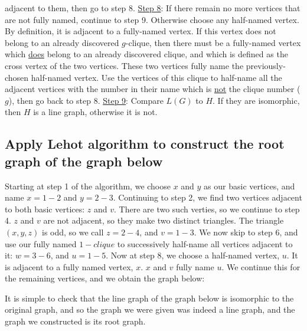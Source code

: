 \documentclass[11pt]{article}
\begin{document}
adjacent to them, then go to step 8.
\newline
\newline
\noindent
\underline{Step 8}:
If there remain no more vertices that are not fully named, continue to step 9.
Otherwise choose any half-named vertex. By definition, it is adjacent to a
fully-named vertex. If this vertex does not belong to an already discovered
$g$-clique, then there must be a fully-named vertex which \underline{does}
belong to an already discovered clique, and which is defined as the cross
vertex of the two vertices. These two vertices fully name the
previously-chosen half-named vertex. Use the vertices of this clique to
half-name all the adjacent vertices with the number in their name which is
\underline{not} the clique number ($g$), then go back to step 8.
\newline
\newline
\noindent
\underline{Step 9}:
Compare $L(G)$ to $H$. If they are isomorphic, then $H$ is a line graph, otherwise it is not.


\subsection{Apply Lehot algorithm to construct the root graph of the graph below}
\begin{figure}[H]
\centering

\end{figure}
Starting at step 1 of the algorithm, we choose $x$ and $y$ as our basic
vertices, and name $x=1-2$ and $y=2-3$. Continuing to step 2, we find two
vertices adjacent to both basic vertices: $z$ and $v$. There are two such
verties, so we continue to step 4. $z$ and $v$ are not adjacent, so they make
two distinct triangles. The triangle $(x,y,z)$ is odd, so we call $z=2-4$, and
$v=1-3$. We now skip to step 6, and use our fully named $1-clique$ to
successively half-name all vertices adjacent to it: $w=3-6$, and $u=1-5$. Now
at step 8, we choose a half-named vertex, $u$. It is adjacent to a fully named
vertex, $x$. $x$ and $v$ fully name $u$. We continue this for the remaining
vertices, and we obtain the graph below:

\begin{figure}[H]
\centering

\end{figure}

It is simple to check that the line graph of the graph below is isomorphic to
the original graph, and so the graph we were given was indeed a line graph,
and the graph we constructed is its root graph.
\end{document}

